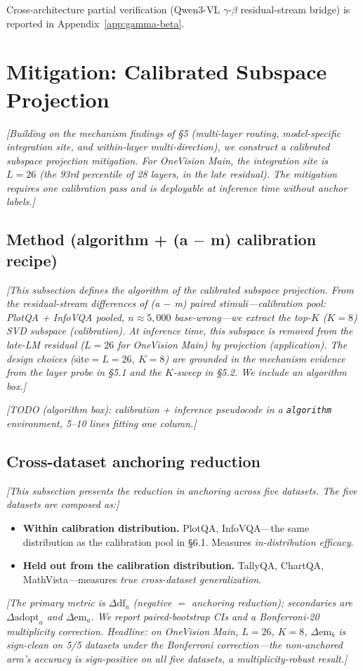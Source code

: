 \documentclass[11pt]{article}
\newcommand{\todoNote}[1]{\textit{\textcolor[rgb]{0.45,0.45,0.45}{[#1]}}}
\begin{document}
Cross-architecture partial verification (Qwen3-VL $\gamma$-$\beta$ residual-stream bridge) is reported in Appendix~\ref{app:gamma-beta}.

\section{Mitigation: Calibrated Subspace Projection}
\todoNote{Building on the mechanism findings of \S5 (multi-layer routing, model-specific integration site, and within-layer multi-direction), we construct a \textit{calibrated subspace projection} mitigation. For OneVision Main, the integration site is $L=26$ (the 93rd percentile of 28 layers, in the late residual). The mitigation requires one calibration pass and is deployable at inference time without anchor labels.}

\subsection{Method (algorithm + (a $-$ m) calibration recipe)}
\label{sec:mitigation-method}
\todoNote{This subsection defines the algorithm of the calibrated subspace projection. From the residual-stream differences of (a $-$ m) paired stimuli---\textit{calibration pool: PlotQA + InfoVQA pooled, $n \approx 5{,}000$ base-wrong}---we extract the top-$K$ ($K = 8$) SVD subspace (calibration). At inference time, this subspace is removed from the late-LM residual ($L = 26$ for OneVision Main) by projection (application). The design choices ($\text{site} = L = 26$, $K = 8$) are grounded in the mechanism evidence from the layer probe in \S5.1 and the $K$-sweep in \S5.2. We include an algorithm box.}

\todoNote{TODO (algorithm box): calibration + inference pseudocode in a \texttt{algorithm} environment, 5--10 lines fitting one column.}

\subsection{Cross-dataset anchoring reduction}
\label{sec:mitigation-results}
\todoNote{This subsection presents the reduction in anchoring across five datasets. The five datasets are composed as:}
\begin{itemize}
  \item \textbf{Within calibration distribution.} PlotQA, InfoVQA---the same distribution as the calibration pool in \S6.1. Measures \textit{in-distribution efficacy}.
  \item \textbf{Held out from the calibration distribution.} TallyQA, ChartQA, MathVista---measures \textit{true cross-dataset generalization}.
\end{itemize}
\todoNote{The primary metric is $\Delta \mathrm{df}_a$ (negative $=$ anchoring reduction); secondaries are $\Delta \mathrm{adopt}_a$ and $\Delta \mathrm{em}_a$. We report paired-bootstrap CIs and a Bonferroni-20 multiplicity correction. Headline: on OneVision Main, $L=26$, $K=8$, \textit{$\Delta \mathrm{em}_b$ is sign-clean on 5/5 datasets under the Bonferroni correction}---the non-anchored arm's accuracy is sign-positive on all five datasets, a multiplicity-robust result.}
\end{document}
